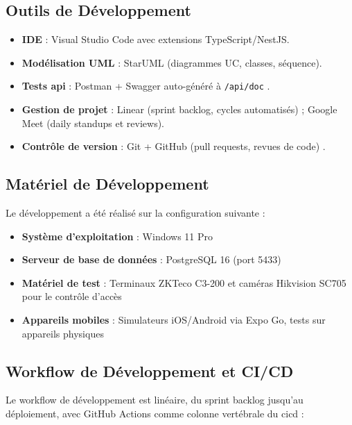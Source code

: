 \documentclass[../main.tex]{subfiles}
\begin{document}
\subsection{Outils de D\'{e}veloppement}

\begin{itemize}
    \item \textbf{IDE} : Visual Studio Code \cite{vscode} avec extensions TypeScript/NestJS.
    \item \textbf{Mod\'{e}lisation UML} : StarUML (diagrammes UC, classes, s\'{e}quence).
    \item \textbf{Tests \acrshort{api}} : Postman \cite{postman} + Swagger auto-g\'{e}n\'{e}r\'{e} \`{a} \texttt{/api/doc} \cite{swagger}.
    \item \textbf{Gestion de projet} : Linear (sprint backlog, cycles automatis\'{e}s) ; Google Meet (daily standups et reviews).
    \item \textbf{Contr\^{o}le de version} : Git + GitHub (pull requests, revues de code) \cite{git}.
\end{itemize}

\subsection{Mat\'{e}riel de D\'{e}veloppement}

Le d\'{e}veloppement a \'{e}t\'{e} r\'{e}alis\'{e} sur la configuration suivante :
\begin{itemize}
    \item \textbf{Syst\`{e}me d'exploitation} : Windows 11 Pro
    \item \textbf{Serveur de base de donn\'{e}es} : PostgreSQL 16 (port 5433)
    \item \textbf{Mat\'{e}riel de test} : Terminaux ZKTeco C3-200 et cam\'{e}ras Hikvision SC705 pour le contr\^{o}le d'acc\`{e}s
    \item \textbf{Appareils mobiles} : Simulateurs iOS/Android via Expo Go, tests sur appareils physiques
\end{itemize}

\subsection{Workflow de D\'{e}veloppement et CI/CD}

Le workflow de d\'{e}veloppement est lin\'{e}aire, du sprint backlog jusqu'au d\'{e}ploiement, avec GitHub Actions comme colonne vert\'{e}brale du \acrshort{cicd} :
\end{document}
